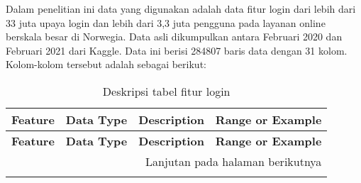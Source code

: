 Dalam penelitian ini data yang digunakan adalah data fitur login dari lebih dari 33 juta upaya login dan lebih dari 3,3 juta pengguna pada layanan online berskala besar di Norwegia. Data asli dikumpulkan antara Februari 2020 dan Februari 2021 dari Kaggle. Data ini berisi 284807 baris data dengan 31 kolom. Kolom-kolom tersebut adalah sebagai berikut:

\begin{longtable}{|p{}|p{}|p{}|p{}|}
    \caption{Deskripsi tabel fitur login} \label{tab:my_label} \\
    \hline
    \textbf{Feature} & \textbf{Data Type} & \textbf{Description} & \textbf{Range or Example} \\ \hline
    \endfirsthead
    
    \hline
    \textbf{Feature} & \textbf{Data Type} & \textbf{Description} & \textbf{Range or Example} \\ \hline
    \endhead
    
    \hline
    \multicolumn{4}{|r|}{{Lanjutan pada halaman berikutnya}} \\ \hline
    \endfoot
    
    \hline
    \endlastfoot
    

\end{longtable}
